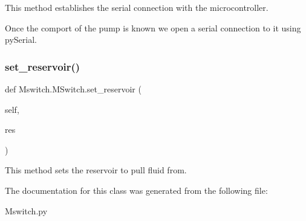 \begin{DoxyVerb}This method establishes the serial connection with the microcontroller.

Once the comport of the pump is known we open a serial connection to it using pySerial.
\end{DoxyVerb}
 \mbox{\label{class_mswitch_1_1_m_switch_abc4ef313e6319d0d71197ffbed7be4c0}} 
\subsubsection{\texorpdfstring{set\_reservoir()}{set\_reservoir()}}
{\footnotesize\ttfamily def Mswitch.\+M\+Switch.\+set\+\_\+reservoir (\begin{DoxyParamCaption}\item[{}]{self,  }\item[{}]{res }\end{DoxyParamCaption})}

\begin{DoxyVerb}This method sets the reservoir to pull fluid from.
\end{DoxyVerb}
 

The documentation for this class was generated from the following file\+:\begin{DoxyCompactItemize}
\item 
Mswitch.\+py\end{DoxyCompactItemize}
